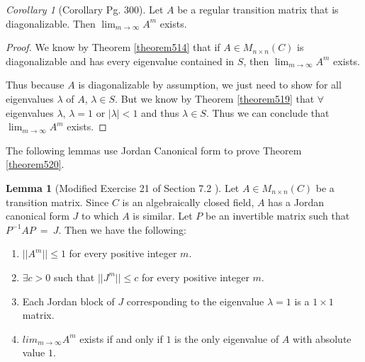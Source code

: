 \documentclass{amsart}
\theoremstyle{definition}
\newtheorem{lemma}[theorem]{Lemma}
\theoremstyle{remark}
\newtheorem{corollary}{Corollary}[theorem]
\numberwithin{equation}{section}
\begin{document}
\begin{corollary}[Corollary Pg. 300]\label{cor519}
Let $A$ be a regular transition matrix that is diagonalizable.
Then $\lim_{m \to \infty} A^m$ exists.

\end{corollary}

\begin{proof}

We know by Theorem \ref{theorem514} that if $A \in M_{n \times n}(C)$ is diagonalizable and has every eigenvalue contained in $S$, then $\lim_{m \to \infty} A^m$ exists.


Thus because $A$ is diagonalizable by assumption, we just need to show for all eigenvalues $\lambda$ of $A$, $\lambda \in S$.
But we know by Theorem \ref{theorem519} that $\forall$ eigenvalues $\lambda$, $\lambda = 1$ or $|\lambda| < 1$ and thus $\lambda \in S$.
Thus we can conclude that $\lim_{m \to \infty} A^m$ exists.

\end{proof}



The following lemmas use Jordan Canonical form to prove Theorem \ref{theorem520}.

\begin{lemma}[Modified Exercise 21 of Section 7.2 \cite{friedberg2003linear}]
	Let $A \in M_{n \times n}(C)$ be a transition matrix.
	Since $C$ is an algebraically closed field, $A$ has a Jordan canonical form $J$ to which $A$ is similar.
	Let $P$ be an invertible matrix such that $P^{-1}AP\ =\ J$.
	Then we have the following:

	\begin{enumerate}
		\item $||A^m|| \leq 1$ for every positive integer $m$.
		\item $\exists c > 0$ such that $||J^m|| \leq c$ for every positive integer $m$.
		\item Each Jordan block of $J$ corresponding to the eigenvalue $\lambda = 1$ is a $1 \times 1$ matrix.
		\item $lim_{m \to \infty}A^m$ exists if and only if $1$ is the only eigenvalue of $A$ with absolute value $1$.

	\end{enumerate}


\end{lemma}
\end{document}
